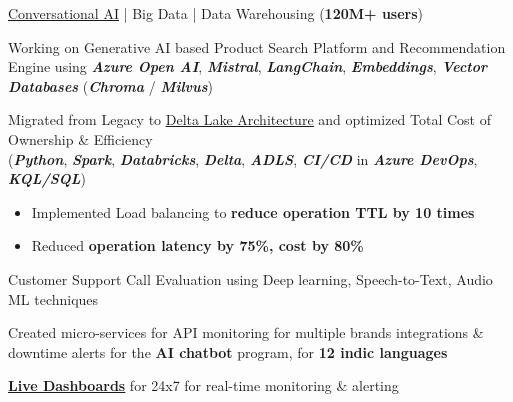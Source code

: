 \documentclass[]{deedy-resume-reversed}
\begin{document}
\vspace{\topsep} %

\begin{tightemize}
\item \href{https://drive.google.com/file/d/1pztxC-TmhhKaqk0sQUJ8XaVXDKmad92V/view?usp=sharing}{\underline{Conversational AI}} | Big Data | Data Warehousing (\textbf{120M+ users})
\item Working on Generative AI based Product Search Platform and Recommendation Engine using \textbf{\textit{Azure Open AI}}, \textbf{\textit{Mistral}}, \textbf{\textit{LangChain}}, \textbf{\textit{Embeddings}}, \textbf{\textit{Vector Databases}} (\textbf{\textit{Chroma}} / \textbf{\textit{Milvus}})
\item Migrated from Legacy to \href{https://drive.google.com/file/d/1FH0p2Gy_5d0h4D7Czsslx3dkdUqMD-IP/view?usp=sharing}{\underline{Delta Lake Architecture}} and optimized Total Cost of Ownership \& Efficiency \\
(\textbf{\textit{Python}}, \textbf{\textit{Spark}}, \textbf{\textit{Databricks}}, \textbf{\textit{Delta}}, \textbf{\textit{ADLS}}, \textbf{\textit{CI/CD}} in \textbf{\textit{Azure DevOps}}, \textbf{\textit{KQL/SQL}})
\begin{itemize}
        \item Implemented Load balancing to\textbf{ reduce operation TTL by 10 times}
        \item Reduced \textbf{operation latency by 75\%, cost by 80\%}
\end{itemize}

\item Customer Support Call Evaluation using Deep learning, Speech-to-Text, Audio ML techniques
\item Created micro-services for API monitoring for multiple brands integrations \& downtime alerts for the \textbf{AI chatbot} program, for \textbf{12 indic languages}
\item \href{https://drive.google.com/file/d/1ON88613DfbFg78HwDsAdzry1J6u3jsra/view?usp=drive_link}{\underline{\textbf{Live Dashboards}}} for 24x7 for real-time monitoring \& alerting
\end{tightemize}
\sectionsep

\vspace{\topsep} %
\end{document}

